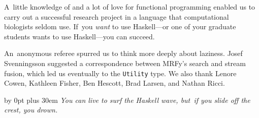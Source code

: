 \documentclass[nonatbib]{sigplanconf}
\newcommand\mrfy{MRFy} %
\begin{document}
A~little knowledge of and a lot of love for functional programming
enabled us to carry out a successful research project in a language
that computational biologists seldom use.
If~you \emph{want} to use Haskell---or one of your graduate students
wants to use Haskell---you can
succeed. 




%  

 

\ifnotcutting
\acks

An~anonymous referee spurred us to think
more deeply about laziness.
Josef Svenningsson suggested a correspondence between \mrfy's search
and stream fusion, which led us eventually to the \texttt{Utility} type.
We also thank Lenore Cowen, Kathleen Fisher, Ben Hescott, Brad
Larsen, and Nathan Ricci. 
\fi







\iffinaldraft


\vfill

\begingroup
\parfillskip=0pt
\advance\leftskip by 0pt plus 30em
\emph{You can live to surf the Haskell wave, but~if you slide off the crest, you
drown.}
\par
\endgroup

\fi

\end{document}
